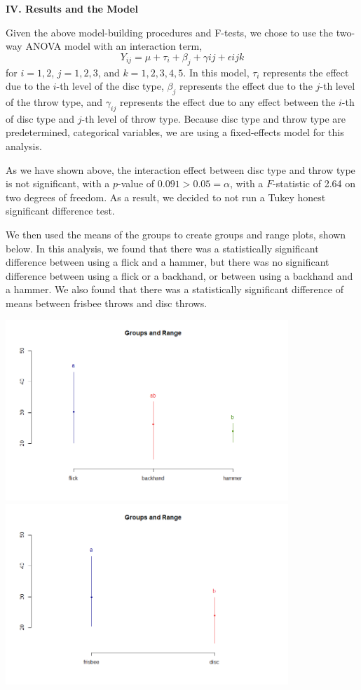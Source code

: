 \documentclass[letter,12pt]{article}
\begin{document}
	\begin{center}
		\textbf{IV. Results and the Model}
	\end{center}
	\justify
	Given the above model-building procedures and F-tests, we chose to use the two-way ANOVA model with an interaction term,
	$$Y_{ij} = \mu + \tau_{i} + \beta_{j} + \gamma{ij} + \epsilon{ijk}$$
	for $i = 1, 2$, $j = 1, 2, 3$, and $k=1, 2, 3, 4, 5$. In this model, $\tau_{i}$ represents the effect due to the $i$-th level of the disc type, $\beta_{j}$ represents the effect due to the $j$-th level of the throw type, and $\gamma_{ij}$ represents the effect due to any effect between the $i$-th of disc type and $j$-th level of throw type. Because disc type and throw type are predetermined, categorical variables, we are using a fixed-effects model for this analysis.\par
	As we have shown above, the interaction effect between disc type and throw type is not significant, with a $p$-value of $0.091 > 0.05 = \alpha$, with a $F$-statistic of 2.64 on two degrees of freedom. As a result, we decided to not run a Tukey honest significant difference test. \par
	We then used the means of the groups to create groups and range plots, shown below. In this analysis, we found that there was a statistically significant difference between using a flick and a hammer, but there was no significant difference between using a flick or a backhand, or between using a backhand and a hammer. We also found that there was a statistically significant difference of means between frisbee throws and disc throws.\par
	\begin{center}
    \includegraphics[width=0.8\textwidth]{grouprangethrow.png}
    \includegraphics[width=0.8\textwidth]{grouprangedisc.png}
  \end{center}
\end{document}
